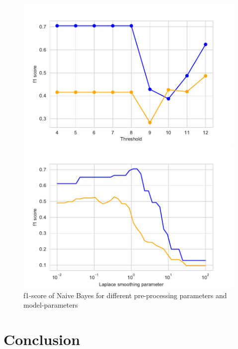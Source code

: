 \documentclass[11pt]{article}
\begin{document}
\begin{figure}[h]
\begin{minipage}[l]{0.5\textwidth}
\includegraphics[width=1\linewidth]{bridges/thresholds_nb.pdf}
\end{minipage}
\begin{minipage}[l]{0.5\textwidth}
\includegraphics[width=1\linewidth]{bridges/laplace_nb.pdf}
\end{minipage}
\caption{f1-score of Naive Bayes for different pre-processing parameters and model-parameters}
\label{Fig:: NB_result_manual parameter_tuning}
\end{figure}

\newpage
\section{Conclusion}
\end{document}
